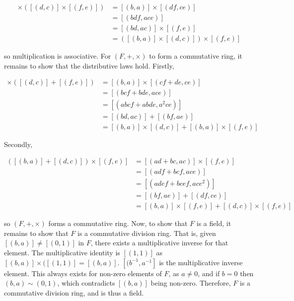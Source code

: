 \documentclass{article}
\begin{document}
\begin{align*}
    [(b, a)]\times([(d, c)]\times[(f, e)])
        &= [(b, a)]\times[(df, ce)]\\
        &= [(bdf, ace)]\\
        &= [(bd, ac)]\times[(f, e)]\\
        &= ([(b, a)]\times[(d, c)])\times[(f, e)]
\end{align*}

so multiplication is associative. For $(F, +, \times)$ to form a commutative ring, it remains
to show that the distributive laws hold. Firstly,

\begin{align*}
    [(b, a)]\times([(d, c)] + [(f, e)]) &= [(b, a)]\times[(cf + de, ce)]\\
    &= [(bcf + bde, ace)]\\
    &= [(abcf + abde, a^2ce)]\\
    &= [(bd, ac)] + [(bf, ae)]\\
    &= [(b, a)]\times[(d, c)] + [(b, a)]\times[(f, e)]
\end{align*}

Secondly,

\begin{align*}
    ([(b, a)] + [(d, c)])\times[(f, e)] &= [(ad + bc, ac)]\times[(f, e)]\\
    &= [(adf + bcf, ace)]\\
    &= [(adef + bcef, ace^2)]\\
    &= [(bf, ae)] + [(df, ce)]\\
    &= [(b, a)]\times[(f, e)] + [(d, c)]\times[(f, e)]
\end{align*}

so $(F, +, \times)$ forms a commutative ring. Now, to show that $F$ is a field, it remains
to show that $F$ is a commutative division ring. That is, given $[(b, a)] \neq [(0, 1)]$ in $F$,
there exists a multiplicative inverse for that element. The multiplicative identity is
$[(1, 1)]$ as $[(b, a)]\times([(1, 1)] = [(b, a)]$. $[(b^{-1}, a^{-1}]$ is the multiplicative
inverse element. This always exists for non-zero elements of $F$, as $a \neq 0$, and if
$b = 0$ then $(b, a) \sim (0, 1)$, which contradicts $[(b, a)]$ being non-zero. Therefore,
$F$ is a commutative division ring, and is thus a field.
\end{document}
